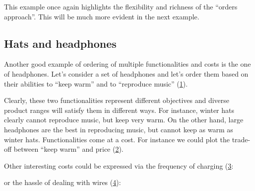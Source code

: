 This example once again highlights the flexibility and richness of the ``orders approach''.
This will be much more evident in the next example.


\subsection{Hats and headphones}
Another good example of ordering of multiple functionalities and costs is the one of headphones.
Let's consider a set of headphones and let's order them based on their abilities to ``keep warm'' and to ``reproduce music'' (\cref{fig:headpho_fun}).

\begin{figure}[h!]
    \centering
    \caption{}
    \label{fig:headpho_fun}
\end{figure}

Clearly, these two functionalities represent different objectives and diverse product ranges will satisfy them in different ways.
For instance, winter hats clearly cannot reproduce music, but keep very warm.
On the other hand, large headphones are the best in reproducing music, but cannot keep as warm as winter hats.
Functionalities come at a cost.
For instance we could plot the trade-off between ``keep warm'' and price (\cref{fig:headpho_price}).

\begin{figure}[h!]
    \centering
    \caption{}
    \label{fig:headpho_price}
\end{figure}
\vfill
\clearpage

Other interesting costs could be expressed via the frequency of charging (\cref{fig:headpho_charge}:

\begin{figure}[h!
    ]
    \centering
    \caption{}
    \label{fig:headpho_charge}
\end{figure}

or the hassle of dealing with wires (\cref{fig:headpho_wires}):

\begin{figure}[h!]
    \centering
    \caption{}
    \label{fig:headpho_wires}
\end{figure}

